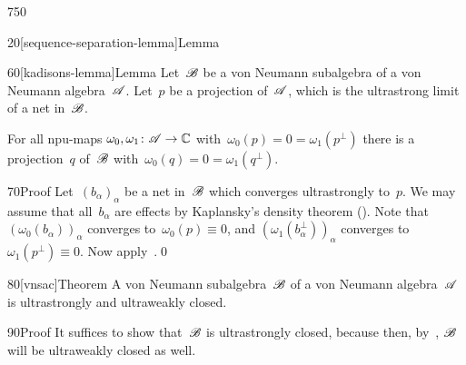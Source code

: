 \begin{parsec}{750}
\begin{point}{20}[sequence-separation-lemma]{Lemma}
\end{point}
\begin{point}{60}[kadisons-lemma]{Lemma}%
Let~$\mathscr{B}$ be a von Neumann subalgebra
of a von Neumann algebra~$\mathscr{A}$.
Let~$p$ be a projection of~$\mathscr{A}$,
which is the ultrastrong limit of a net in~$\mathscr{B}$.

For all npu-maps $\omega_0,\omega_1\colon \mathscr{A}\to\mathbb{C}$
with~$\omega_0(p)=0= \omega_1(p^\perp)$
there is a projection~$q$ of~$\mathscr{B}$
with~$\omega_0(q)=0=\omega_1(q^\perp)$.
\begin{point}{70}{Proof}%
Let~$(b_\alpha)_\alpha$ be a net in~$\mathscr{B}$
which converges ultrastrongly to~$p$.
We may assume that all~$b_\alpha$
are effects
by Kaplansky's density theorem ().
Note that~$(\omega_0(b_\alpha))_\alpha$ converges to~$\omega_0(p)\equiv 0$,
and $(\omega_1(b^\perp_\alpha))_\alpha$ converges 
to~$\omega_1(p^\perp)\equiv 0$.
Now apply~.\qed
\end{point}
\end{point}
\begin{point}{80}[vnsac]{Theorem}%
A von Neumann subalgebra~$\mathscr{B}$ of a von Neumann algebra~$\mathscr{A}$
is ultrastrongly and ultraweakly closed.
\begin{point}{90}{Proof}%
It suffices to show that~$\mathscr{B}$ is ultrastrongly closed,
because then, by~, $\mathscr{B}$ will be ultraweakly closed
as well.


\end{point}
\end{point}
\end{parsec}
